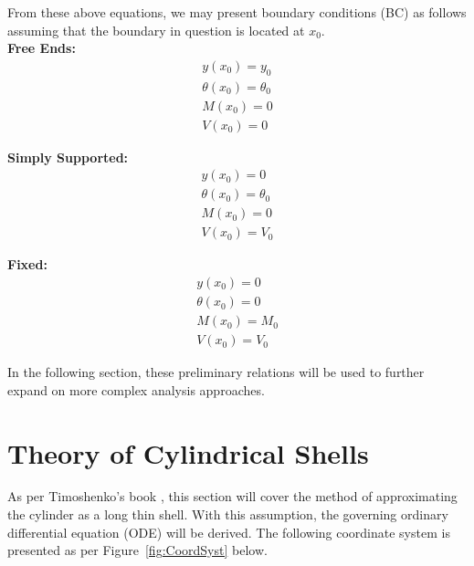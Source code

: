 From these above equations, we may present boundary conditions (BC) as follows assuming that the boundary in question is located at $x_0$.\\

\textbf{Free Ends:}\\
\begin{equation}
	\label{eq:2_freeBC}
	\begin{aligned}
		y(x_0) = y_0          \\
		\theta(x_0)= \theta_0 \\
		M(x_0) = 0            \\
		V(x_0) = 0            
	\end{aligned}
\end{equation}

\textbf{Simply Supported:}\\
\begin{equation}
	\label{eq:2_endBC}
	\begin{aligned}
		y(x_0)= 0            \\
		\theta(x_0)=\theta_0 \\
		M(x_0)= 0            \\
		V(x_0) =V_0          
	\end{aligned}
\end{equation}

\textbf{Fixed:}\\
\begin{equation}
	\label{eq:2_fixedBC}
	\begin{aligned}
		y(x_0)=0      \\
		\theta(x_0)=0 \\
		M(x_0)=M_0    \\
		V(x_0) =V_0   
	\end{aligned}
\end{equation}

In the following section, these preliminary relations will be used to further expand on more complex analysis approaches.

\section{Theory of Cylindrical Shells}


As per Timoshenko's book \cite{timoshenko1959theory}, this section will cover the method of approximating the cylinder as a long thin shell. With this assumption, the governing ordinary differential equation (ODE) will be derived. The following coordinate system is presented as per Figure~\ref{fig:CoordSyst} below.

